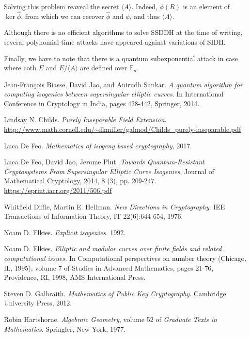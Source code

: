 \documentclass{article}
\theoremstyle{theorem}
\theoremstyle{definition}
\begin{document}
Solving this problem reaveal the secret $\langle A \rangle$. Indeed, $\phi(R)$ is an element of $\ker\hat{\phi}$, from which we can recover $\hat{\phi}$ and $\phi$, and thus $\langle A \rangle$. 

Although there is no efficient algorithms to solve SSDDH at the time of writing, several polynomial-time attacks have appeared  against variations of SIDH.

Finally, we have to note that there is a quantum subexponential attack \cite{IsogeniesSSEC} in case where coth $E$ and $E/\langle A \rangle$ are defined over $\mathbb{F}_p$.

\newpage
\begin{thebibliography}{}
	 Jean-François Biasse, David Jao, and Anirudh Sankar. \textit{A quantum algorithm for computing isogenies between supersingular elliptic curves}. In International Conference in Cryptology in India, pages 428-442, Springer, 2014.
	
	 Lindsay N. Childs. \textit{Purely Inseparable Field Extension}. \url{http://www.math.cornell.edu/~dkmiller/galmod/Childs_purely-inseparable.pdf}
	
	 Luca De Feo. \textit{Mathematics of isogeny based cryptography}, 2017.
	
	 Luca De Feo, David Jao, Jerome Plut. \textit{Towards Quantum-Resistant Cryptosystems From Supersingular Elliptic Curve Isogenies}, Journal of Mathematical Cryptology, 2014, 8 (3), pp. 209-247. \url{https://eprint.iacr.org/2011/506.pdf}
	
	 Whitfield Diffie, Martin E. Hellman. \textit{New Directions in Cryptography}. IEE Transactions of Information Theory, IT-22(6):644-654, 1976.
	
	 Noam D. Elkies. \textit{Explicit isogenies.} 1992.
	
	 Noam D. Elkies. \textit{Elliptic and modular curves over finite fields and related computational issues.} In Computational perspectives on number theory (Chicago, IL, 1995), volume 7 of Studies in Advanced Mathematics, pages 21-76, Providence, RI, 1998, AMS International Press.
	
	 Steven D. Galbraith. \textit{Mathematics of Public Key Cryptography}. Cambridge University Press, 2012.
	
	 Robin Hartshorne. \textit{Algebraic Geometry}, volume 52 of \textit{Graduate Texts in Mathematics}. Springler, New-York, 1977.
	

\end{thebibliography}
\end{document}
